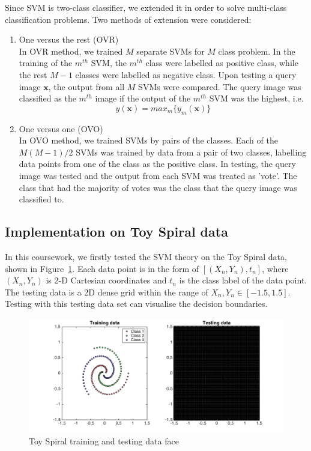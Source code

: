 \documentclass[10pt,twocolumn,letterpaper]{article}
\begin{document}
Since SVM is two-class classifier, we extended it in order to solve multi-class classification problems. Two methods of extension were considered:

\begin{enumerate}
	\item One versus the rest (OVR)\\
	In OVR method, we trained $M$ separate SVMs for $M$ class problem. In the training of the $m^{th}$ SVM, the $m^{th}$ class were labelled as positive class, while the rest $M-1$ classes were labelled as negative class. Upon testing a query image $\boldsymbol{x}$, the output from all $M$ SVMs were compared. The query image was classified as the $m^{th}$ image if the output of the $m^{th}$ SVM was the highest, i.e.
	\begin{equation}
		y(\boldsymbol{x}) = max_m \{ y_m(\boldsymbol{x}) \}
	\end{equation}
	
	\item One versus one (OVO)\\
	In OVO method, we trained SVMs by pairs of the classes. Each of the $M(M-1)/2$ SVMs was trained by data from a pair of two classes, labelling data points from one of the class as the positive class. In testing, the query image was tested and the output from each SVM was treated as 'vote'. The class that had the majority of votes was the class that the query image was classified to.
\end{enumerate}

\subsection{Implementation on Toy Spiral data}
In this coursework, we firstly tested the SVM theory on the Toy Spiral data, shown in Figure~\ref{fig:q2_data}. Each data point is in the form of $ [(X_n, Y_n), t_n]$, where $(X_n, Y_n)$ is 2-D Cartesian coordinates and $t_n$ is the class label of the data point. The testing data is a 2D dense grid within the range of $X_n, Y_n \in [-1.5, 1.5]$. Testing with this testing data set can visualise the decision boundaries.

\begin{figure}
	\begin{center}
		\includegraphics[width=0.8\linewidth]{q2_data}
		\caption{Toy Spiral training and testing data face}
			\label{fig:q2_data}
	\end{center}
\end{figure}
\end{document}

